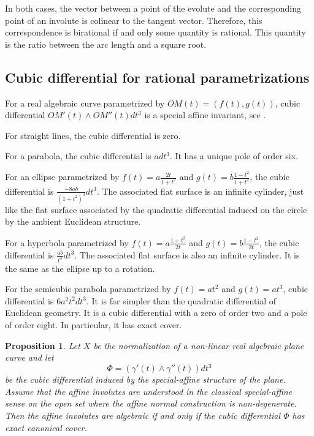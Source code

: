 \documentclass[reqno]{amsart}
\newtheorem{proposition}[theorem]{Proposition}
\theoremstyle{definition}
\theoremstyle{remark}
\theoremstyle{definition}
\theoremstyle{definition}
\theoremstyle{definition}
\begin{document}
In both cases, the vector between a point of the evolute and the corresponding point of an involute is colinear to the tangent vector. Therefore, this correspondence is birational if and only some quantity is rational. This quantity is the ratio between the arc length and a square root.

\subsection{Cubic differential for rational parametrizations}

For a real algebraic curve parametrized by $OM(t)=(f(t),g(t))$, cubic differential $OM'(t) \wedge OM''(t)dt^{3}$ is a special affine invariant, see \cite{COT}.

For straight lines, the cubic differential is zero.

For a parabola, the cubic differential is $adt^{3}$. It has a unique pole of order six.

For an ellipse parametrized by $f(t)=a\frac{2t}{1+t^{2}}$ and $g(t)=b\frac{1-t^{2}}{1+t^{2}}$, the cubic differential is $\frac{-8ab}{(1+t^{2})^{3}}dt^{3}$. The associated flat surface is an infinite cylinder, just like the flat surface associated by the quadratic differential induced on the circle by the ambient Euclidean structure.

For a hyperbola parametrized by $f(t)=a\frac{1+t^{2}}{2t}$ and $g(t)=b\frac{1-t^{2}}{2t}$, the cubic differential is $\frac{ab}{t^{3}}dt^{3}$. The associated flat surface is also an infinite cylinder. It is the same as the ellipse up to a rotation.

For the semicubic parabola parametrized by $f(t)=at^{2}$ and $g(t)=at^{3}$, cubic differential is $6a^{2}t^{2}dt^{3}$. It is far simpler than the quadratic differential of Euclidean geometry. It is a cubic differential with a zero of order two and a pole of order eight. In particular, it has exact cover.

\begin{proposition}\label{prop:affine-involutes-exact}
Let $X$ be the normalization of a non-linear real algebraic plane curve and let
\[
\Phi=(\gamma'(t)\wedge\gamma''(t))dt^{3}
\]
be the cubic differential induced by the special-affine structure of the plane.
Assume that the affine involutes are understood in the classical special-affine
sense on the open set where the affine normal construction is non-degenerate.
Then the affine involutes are algebraic if and only if the cubic differential
$\Phi$ has exact canonical cover.
\end{proposition}
\end{document}
